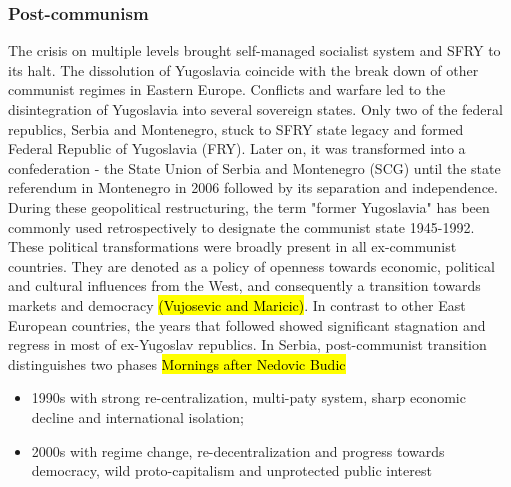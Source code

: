 \documentclass[11pt]{report}
\begin{document}
\subsubsection{Post-communism}
The crisis on multiple levels brought self-managed socialist system and SFRY to its halt. The dissolution of Yugoslavia coincide with the break down of other communist regimes in Eastern Europe. Conflicts and warfare led to the disintegration of Yugoslavia into several sovereign states. Only two of the federal republics, Serbia and Montenegro, stuck to SFRY state legacy and formed Federal Republic of Yugoslavia (FRY). Later on, it was transformed into a confederation - the State Union of Serbia and Montenegro (SCG) until the state referendum in Montenegro in 2006 followed by its separation and independence. During these geopolitical restructuring, the term "former Yugoslavia" has been commonly used retrospectively to designate the communist state 1945-1992.
\\
These political transformations were broadly present in all ex-communist countries. They are denoted as a policy of openness towards economic, political and cultural influences from the West, and consequently a transition towards markets and democracy \hl{(Vujosevic and Maricic)}. In contrast to other East European countries, the years that followed showed significant stagnation and regress in most of ex-Yugoslav republics. In Serbia, post-communist transition distinguishes two phases \hl{Mornings after Nedovic Budic} 
\begin{itemize}
\item 1990s with strong re-centralization, multi-paty system, sharp economic decline and international isolation;
\item 2000s with regime change, re-decentralization and progress towards democracy, wild proto-capitalism and unprotected public interest
\end{itemize}       
     
\end{document}
